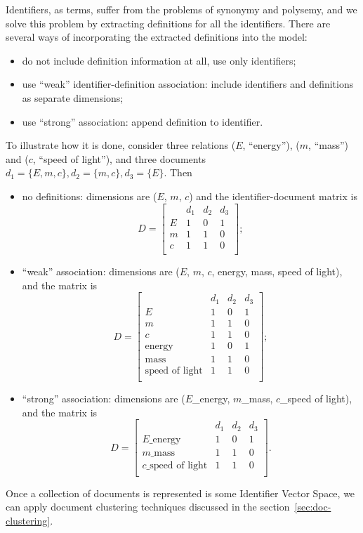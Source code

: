 Identifiers, as terms, suffer from the problems of synonymy and polysemy,
and we solve this problem by extracting definitions for all the identifiers.
There are several ways of incorporating the extracted definitions into the
model:

\begin{itemize}
\itemsep1pt\parskip0pt
  \item do not include definition information at all, use only identifiers;
  \item use ``weak'' identifier-definition association: include identifiers and
        definitions as separate dimensions;
  \item use ``strong'' association: append definition to identifier.
\end{itemize}

To illustrate how it is done, consider three relations ($E$, ``energy''),
($m$, ``mass'') and ($c$, ``speed of light''), and three documents
$d_1 = \{E, m, c\}, d_2 = \{ m, c\}, d_3 = \{ E \}$. Then

\begin{itemize}\itemsep1pt\parskip0pt
  \item no definitions: dimensions are ($E$, $m$, $c$) and the identifier-document matrix is
  $$D = \left[
    \begin{array}{c|ccc}
       & d_1 & d_2 & d_3 \\
      \hline
      E & 1 & 0 & 1  \\
      m & 1 & 1 & 0 \\
      c & 1 & 1 & 0 \\
    \end{array}
  \right];$$
  \item ``weak'' association: dimensions are ($E$, $m$, $c$, energy, mass,
  speed of light), and the matrix is $$D = \left[
    \begin{array}{r|ccc}
       & d_1 & d_2 & d_3 \\
      \hline
      E                     & 1 & 0 & 1  \\
      m                     & 1 & 1 & 0 \\
      c                     & 1 & 1 & 0 \\
      \text{energy}         & 1 & 0 & 1  \\
      \text{mass}           & 1 & 1 & 0 \\
      \text{speed of light} & 1 & 1 & 0 \\
    \end{array}
  \right];$$
  \item ``strong'' association: dimensions are ($E$\_energy, $m$\_mass, $c$\_speed of light), and the matrix is $$D = \left[
    \begin{array}{r|ccc}
       & d_1 & d_2 & d_3 \\
      \hline
      E\text{\_energy} & 1 & 0 & 1  \\
      m\text{\_mass} & 1 & 1 & 0 \\
      c\text{\_speed of light} & 1 & 1 & 0 \\
    \end{array}
  \right].$$
\end{itemize}

Once a collection of documents is represented is some Identifier Vector Space, we 
can apply document clustering techniques discussed in the section~\ref{sec:doc-clustering}.
